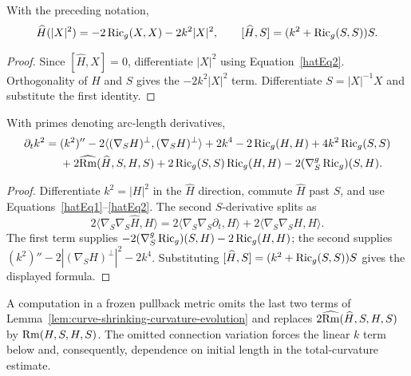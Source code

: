 \begin{lemma}
\label{lem:curve-shrinking-first-variation}
\label{1stcurvshr}


With the preceding notation,
\[
\widehat H(|X|^2)=-2\operatorname{Ric}_g(X,X)-2k^2|X|^2,
\qquad
[\widehat H,S]=(k^2+\operatorname{Ric}_g(S,S))S.
\]
\end{lemma}
\begin{proof}
\sketch Since $[\widehat H,X]=0$, differentiate $|X|^2$ using
Equation~\eqref{hatEq2}. Orthogonality of $H$ and $S$ gives the $-2k^2|X|^2$
term. Differentiate $S=|X|^{-1}X$ and substitute the first identity.
\end{proof}

\begin{lemma}
\label{lem:curve-shrinking-curvature-evolution}
\label{2ndcurvshr}


With primes denoting arc-length derivatives,
\begin{align*}
\partial_tk^2={}&(k^2)''-2\langle(\nabla_SH)^\perp,(\nabla_SH)^\perp\rangle+2k^4
-2\operatorname{Ric}_g(H,H)+4k^2\operatorname{Ric}_g(S,S)\\
&+2\widehat{\operatorname{Rm}}(\widehat H,S,H,S)
+2\operatorname{Ric}_g(S,S)\operatorname{Ric}_g(H,H)-2(\nabla^g_S\operatorname{Ric}_g)(S,H).
\end{align*}
\end{lemma}
\begin{proof}
\sketch Differentiate $k^2=|H|^2$ in the $\widehat H$ direction, commute $\widehat H$
past $S$, and use Equations~\eqref{hatEq1}--\eqref{hatEq2}. The second
$S$-derivative splits as
\begin{equation}\label{hatEq3}
2\langle\nabla_S\nabla_S\widehat H,H\rangle
=2\langle\nabla_S\nabla_S\partial_t,H\rangle
+2\langle\nabla_S\nabla_SH,H\rangle.
\end{equation}
The first term supplies $-2(\nabla^g_S\operatorname{Ric}_g)(S,H)-2\operatorname{Ric}_g(H,H)$; the second
supplies $(k^2)''-2|(\nabla_SH)^\perp|^2-2k^4$. Substituting
$[\widehat H,S]=(k^2+\operatorname{Ric}_g(S,S))S$ gives the displayed formula.
\end{proof}

\begin{remark}
\label{rem:curve-shrinking-evolution-erratum}

A computation in a frozen pullback metric omits the last two terms of
Lemma~\ref{lem:curve-shrinking-curvature-evolution} and replaces
$2\widehat{\operatorname{Rm}}(\widehat H,S,H,S)$ by $\operatorname{Rm}(H,S,H,S)$. The omitted connection
variation forces the linear $k$ term below and, consequently, dependence on
initial length in the total-curvature estimate.
\end{remark}

